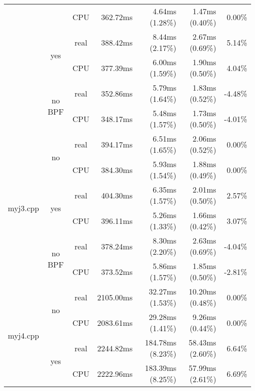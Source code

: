 \documentclass[en]{pracamgr}
\begin{document}
\begin{small}
\begin{longtable}{|l|c|c|r|r|r|r|}
                            &                         & CPU  & 362.72ms & 4.64ms (1.28\%) & 1.47ms (0.40\%) & 0.00\% \\*
                            \cline{2-7}
                            & \multirow{2}{*}{yes}    & real & 388.42ms & 8.44ms (2.17\%) & 2.67ms (0.69\%) & 5.14\% \\*
                            &                         & CPU  & 377.39ms & 6.00ms (1.59\%) & 1.90ms (0.50\%) & 4.04\% \\*
                            \cline{2-7}
                            & \multirow{2}{*}{no BPF} & real & 352.86ms & 5.79ms (1.64\%) & 1.83ms (0.52\%) & -4.48\% \\*
                            &                         & CPU  & 348.17ms & 5.48ms (1.57\%) & 1.73ms (0.50\%) & -4.01\% \\
\hline
\multirow{6}{*}{myj3.cpp}   & \multirow{2}{*}{no}     & real & 394.17ms & 6.51ms (1.65\%) & 2.06ms (0.52\%) & 0.00\% \\*
                            &                         & CPU  & 384.30ms & 5.93ms (1.54\%) & 1.88ms (0.49\%) & 0.00\% \\*
                            \cline{2-7}
                            & \multirow{2}{*}{yes}    & real & 404.30ms & 6.35ms (1.57\%) & 2.01ms (0.50\%) & 2.57\% \\*
                            &                         & CPU  & 396.11ms & 5.26ms (1.33\%) & 1.66ms (0.42\%) & 3.07\% \\*
                            \cline{2-7}
                            & \multirow{2}{*}{no BPF} & real & 378.24ms & 8.30ms (2.20\%) & 2.63ms (0.69\%) & -4.04\% \\*
                            &                         & CPU  & 373.52ms & 5.86ms (1.57\%) & 1.85ms (0.50\%) & -2.81\% \\
\hline
\multirow{6}{*}{myj4.cpp}   & \multirow{2}{*}{no}     & real & 2105.00ms & 32.27ms (1.53\%) & 10.20ms (0.48\%) & 0.00\% \\*
                            &                         & CPU  & 2083.61ms & 29.28ms (1.41\%) & 9.26ms (0.44\%) & 0.00\% \\*
                            \cline{2-7}
                            & \multirow{2}{*}{yes}    & real & 2244.82ms & 184.78ms (8.23\%) & 58.43ms (2.60\%) & 6.64\% \\*
                            &                         & CPU  & 2222.96ms & 183.39ms (8.25\%) & 57.99ms (2.61\%) & 6.69\% \\*

\end{longtable}
\end{small}
\end{document}
